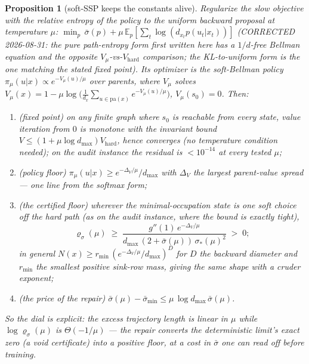 \documentclass[11pt]{article}
\newtheorem{proposition}[theorem]{Proposition}
\theoremstyle{definition}
\theoremstyle{remark}
\begin{document}
\begin{proposition}[soft-SSP keeps the constants alive]\label{prop:soft_ssp_notes}
Regularize the slow objective with the relative entropy of the policy to the uniform
backward proposal at temperature $\mu$:
$\min_p\,\bar\sigma(p) + \mu\,\mathbb E_p[\sum_t\log(d_{x_t}p(u_t|x_t))]$
(CORRECTED 2026-08-31: the pure path-entropy form first written here has a
$1/d$-free Bellman equation and the opposite $V_\mu$-vs-$V_{\mathrm{hard}}$
comparison; the KL-to-uniform form is the one matching the stated fixed point).
Its optimizer is the
soft-Bellman policy $\pi_\mu(u|x)\propto e^{-V_\mu(u)/\mu}$ over parents, where $V_\mu$
solves $V_\mu(x) = 1-\mu\log\bigl(\tfrac1{d_x}\sum_{u\in\mathrm{pa}(x)}
e^{-V_\mu(u)/\mu}\bigr)$, $V_\mu(s_0)=0$. Then:
\begin{enumerate}
    \item \emph{(fixed point)} on any finite graph where $s_0$ is reachable from
    every state, value iteration from $0$ is monotone with the invariant bound
    $V\leq(1+\mu\log d_{\max})V_{\mathrm{hard}}$, hence converges (no temperature
    condition needed); on the audit instance the residual is $<10^{-14}$ at every
    tested $\mu$;
    \item \emph{(policy floor)} $\pi_\mu(u|x)\geq e^{-\Delta_V/\mu}/d_{\max}$ with
    $\Delta_V$ the largest parent-value spread --- one line from the softmax form;
    \item \emph{(the certified floor)} wherever the minimal-occupation state is one soft
    choice off the hard path (as on the audit instance, where the bound is
    \emph{exactly tight}),
    \begin{equation*}
        \varrho_\sigma(\mu)\;\geq\;
        \frac{g''(1)\,e^{-\Delta_V/\mu}}{d_{\max}\,(2+\bar\sigma(\mu))\,\sigma_*(\mu)^2}
        \;>\;0 ;
    \end{equation*}
    in general $N(x)\geq r_{\min}\,(e^{-\Delta_V/\mu}/d_{\max})^{D}$ for $D$ the
    backward diameter and $r_{\min}$ the smallest positive sink-row mass, giving the
    same shape with a cruder exponent;
    \item \emph{(the price of the repair)} $\bar\sigma(\mu)-\bar\sigma_{\min} \leq
    \mu\,\log d_{\max}\,\bar\sigma(\mu)$.
\end{enumerate}
So the dial is explicit: the excess trajectory length is \emph{linear} in $\mu$ while
$\log\varrho_\sigma(\mu)$ is $\Theta(-1/\mu)$ --- the repair converts the deterministic
limit's exact zero (a void certificate) into a positive floor, at a cost in $\bar\sigma$
one can read off before training.
\end{proposition}
\end{document}
